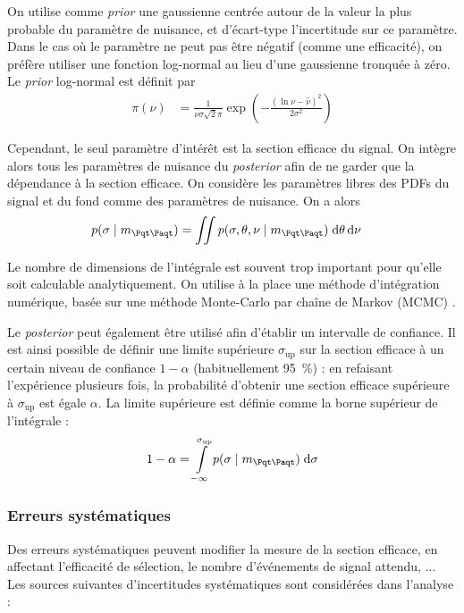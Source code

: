 On utilise comme \emph{prior} une gaussienne centrée autour de la valeur la plus probable du paramètre de nuisance, et d'écart-type l'incertitude sur ce paramètre. Dans le cas où le paramètre ne peut pas être négatif (comme une efficacité), on préfère utiliser une fonction log-normal au lieu d'une gaussienne tronquée à zéro. Le \emph{prior} log-normal est définit par
\begin{align*}
  \pi(\nu) &= \frac{1}{\nu \sigma \sqrt{2} \pi} \exp{\left( - \frac{\left( \ln\nu - \hat{\nu}\right)^2}{2 \sigma^2} \right)}
\end{align*}

Cependant, le seul paramètre d'intérêt est la section efficace du signal. On intègre alors tous les paramètres de nuisance du \emph{posterior} afin de ne garder que la dépendance à la section efficace. On considère les paramètres libres des PDFs du signal et du fond comme des paramètres de nuisance. On a alors
\begin{align*}
  p(\sigma \mid \mtt) &= \iint{ p(\sigma, \theta, \nu \mid \mtt) \; \mathrm{d\theta} \, \mathrm{d} \nu }
\end{align*}

Le nombre de dimensions de l'intégrale est souvent trop important pour qu'elle soit calculable analytiquement. On utilise à la place une méthode d'intégration numérique, basée sur une méthode Monte-Carlo par chaîne de Markov (MCMC) \citep{metropolis,hastings70}.

\smallskip

Le \emph{posterior} peut également être utilisé afin d'établir un intervalle de confiance. Il est ainsi possible de définir une limite supérieure $\sigma_\text{up}$ sur la section efficace à un certain niveau de confiance $1 - \alpha$ (habituellement \SI{95}{\percent}) : en refaisant l'expérience plusieurs fois, la probabilité d'obtenir une section efficace supérieure à $\sigma_\text{up}$ est égale $ \alpha$.
La limite supérieure est définie comme la borne supérieur de l'intégrale :
\begin{align*}
  1 - \alpha = \int \limits_{-\infty}^{\sigma_{\text{up}}} p(\sigma \mid \mtt) \; \mathrm{d} \sigma
\end{align*}

\subsubsection{Erreurs systématiques}

Des erreurs systématiques peuvent modifier la mesure de la section efficace, en affectant l'efficacité de sélection, le nombre d'événements de signal attendu, ... Les sources suivantes d'incertitudes systématiques sont considérées dans l'analyse :

